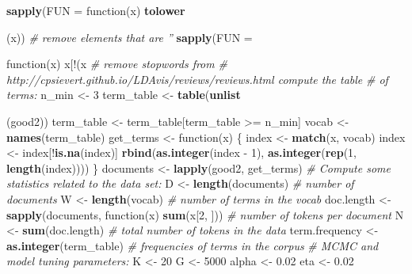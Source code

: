 \documentclass[12pt,]{article}
\newenvironment{Shaded}{\begin{snugshade}}{\end{snugshade}}
\newcommand{\KeywordTok}[1]{\textcolor[rgb]{0.13,0.29,0.53}{\textbf{{#1}}}}
\newcommand{\DataTypeTok}[1]{\textcolor[rgb]{0.13,0.29,0.53}{{#1}}}
\newcommand{\DecValTok}[1]{\textcolor[rgb]{0.00,0.00,0.81}{{#1}}}
\newcommand{\FloatTok}[1]{\textcolor[rgb]{0.00,0.00,0.81}{{#1}}}
\newcommand{\StringTok}[1]{\textcolor[rgb]{0.31,0.60,0.02}{{#1}}}
\newcommand{\CommentTok}[1]{\textcolor[rgb]{0.56,0.35,0.01}{\textit{{#1}}}}
\newcommand{\OtherTok}[1]{\textcolor[rgb]{0.56,0.35,0.01}{{#1}}}
\newcommand{\NormalTok}[1]{{#1}}
\begin{document}
\begin{Shaded}
\begin{Highlighting}[]
{{{{{{{{\KeywordTok{sapply}\NormalTok{(}\DataTypeTok{FUN =} \NormalTok{function(x) }\KeywordTok{tolower}\NormalTok{(x)) %
\StringTok{    }\CommentTok{# remove elements that are ''}
\KeywordTok{sapply}\NormalTok{(}\DataTypeTok{FUN =} \NormalTok{function(x) x[!(x %
\CommentTok{# remove stopwords from}
\CommentTok{# http://cpsievert.github.io/LDAvis/reviews/reviews.html compute the table}
\CommentTok{# of terms:}
\NormalTok{n_min <-}\StringTok{ }\DecValTok{3}
\NormalTok{term_table <-}\StringTok{ }\KeywordTok{table}\NormalTok{(}\KeywordTok{unlist}\NormalTok{(good2)) %
\NormalTok{term_table <-}\StringTok{ }\NormalTok{term_table[term_table >=}\StringTok{ }\NormalTok{n_min]}
\NormalTok{vocab <-}\StringTok{ }\KeywordTok{names}\NormalTok{(term_table)}
\NormalTok{get_terms <-}\StringTok{ }\NormalTok{function(x) \{}
    \NormalTok{index <-}\StringTok{ }\KeywordTok{match}\NormalTok{(x, vocab)}
    \NormalTok{index <-}\StringTok{ }\NormalTok{index[!}\KeywordTok{is.na}\NormalTok{(index)]}
    \KeywordTok{rbind}\NormalTok{(}\KeywordTok{as.integer}\NormalTok{(index -}\StringTok{ }\DecValTok{1}\NormalTok{), }\KeywordTok{as.integer}\NormalTok{(}\KeywordTok{rep}\NormalTok{(}\DecValTok{1}\NormalTok{, }\KeywordTok{length}\NormalTok{(index))))}
\NormalTok{\}}
\NormalTok{documents <-}\StringTok{ }\KeywordTok{lapply}\NormalTok{(good2, get_terms)}
\CommentTok{# Compute some statistics related to the data set:}
\NormalTok{D <-}\StringTok{ }\KeywordTok{length}\NormalTok{(documents)  }\CommentTok{# number of documents }
\NormalTok{W <-}\StringTok{ }\KeywordTok{length}\NormalTok{(vocab)  }\CommentTok{# number of terms in the vocab}
\NormalTok{doc.length <-}\StringTok{ }\KeywordTok{sapply}\NormalTok{(documents, function(x) }\KeywordTok{sum}\NormalTok{(x[}\DecValTok{2}\NormalTok{, ]))  }\CommentTok{# number of tokens per document }
\NormalTok{N <-}\StringTok{ }\KeywordTok{sum}\NormalTok{(doc.length)  }\CommentTok{# total number of tokens in the data }
\NormalTok{term.frequency <-}\StringTok{ }\KeywordTok{as.integer}\NormalTok{(term_table)  }\CommentTok{# frequencies of terms in the corpus}
\CommentTok{# MCMC and model tuning parameters:}
\NormalTok{K <-}\StringTok{ }\DecValTok{20}
\NormalTok{G <-}\StringTok{ }\DecValTok{5000}
\NormalTok{alpha <-}\StringTok{ }\FloatTok{0.02}
\NormalTok{eta <-}\StringTok{ }\FloatTok{0.02}

}}}}}}}}}}}
\end{Highlighting}
\end{Shaded}
\end{document}
